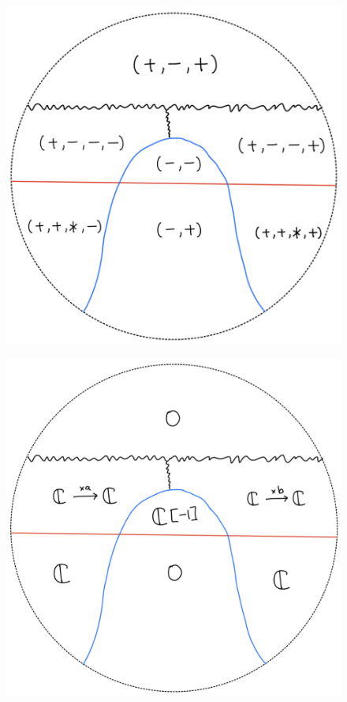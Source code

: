 \begin{figure}[H]
    \centering
    \includegraphics[scale = 0.45]{diagrams/lemma2/34.png} 
    \caption{}
    \label{fig:your-label}
\end{figure}
\begin{figure}[H]
    \centering
    \includegraphics[scale = 0.45]{diagrams/lemma2/35.png} 
    \caption{}
    \label{fig:your-label}
\end{figure}
